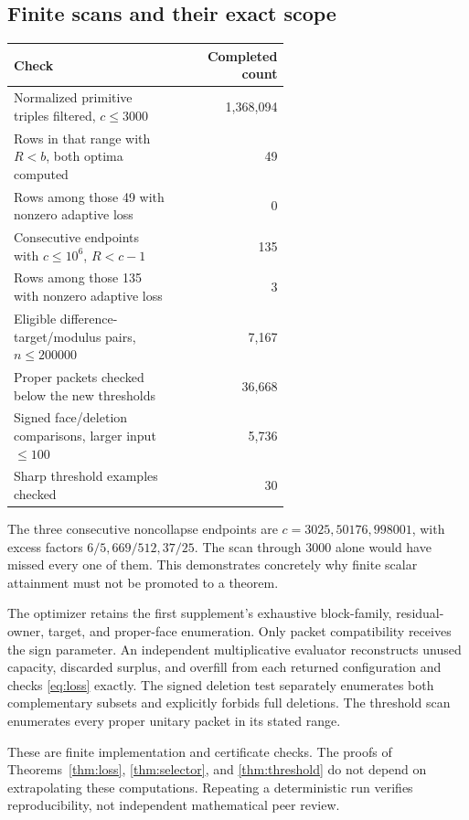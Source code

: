 \documentclass[11pt]{article}
\theoremstyle{definition}\newtheorem{definition}[theorem]{Definition}
\theoremstyle{remark}\newtheorem{remark}[theorem]{Remark}
\begin{document}
\subsection{Finite scans and their exact scope}
\begin{center}
\begin{tabular}{p{0.60\linewidth}r}
\toprule
Check & Completed count\\\midrule
Normalized primitive triples filtered, \(c\le3000\) & 1,368,094\\
Rows in that range with \(R<b\), both optima computed & 49\\
Rows among those 49 with nonzero adaptive loss & 0\\
Consecutive endpoints with \(c\le10^6\), \(R<c-1\) & 135\\
Rows among those 135 with nonzero adaptive loss & 3\\
Eligible difference-target/modulus pairs, \(n\le200000\) & 7,167\\
Proper packets checked below the new thresholds & 36,668\\
Signed face/deletion comparisons, larger input \(\le100\) & 5,736\\
Sharp threshold examples checked & 30\\\bottomrule
\end{tabular}
\end{center}
The three consecutive noncollapse endpoints are \(c=3025,50176,998001\), with excess factors \(6/5,669/512,37/25\). The scan through \(3000\) alone would have missed every one of them. This demonstrates concretely why finite scalar attainment must not be promoted to a theorem.

The optimizer retains the first supplement's exhaustive block-family, residual-owner, target, and proper-face enumeration. Only packet compatibility receives the sign parameter. An independent multiplicative evaluator reconstructs unused capacity, discarded surplus, and overfill from each returned configuration and checks \eqref{eq:loss} exactly. The signed deletion test separately enumerates both complementary subsets and explicitly forbids full deletions. The threshold scan enumerates every proper unitary packet in its stated range.

These are finite implementation and certificate checks. The proofs of Theorems~\ref{thm:loss}, \ref{thm:selector}, and \ref{thm:threshold} do not depend on extrapolating these computations. Repeating a deterministic run verifies reproducibility, not independent mathematical peer review.
\end{document}
